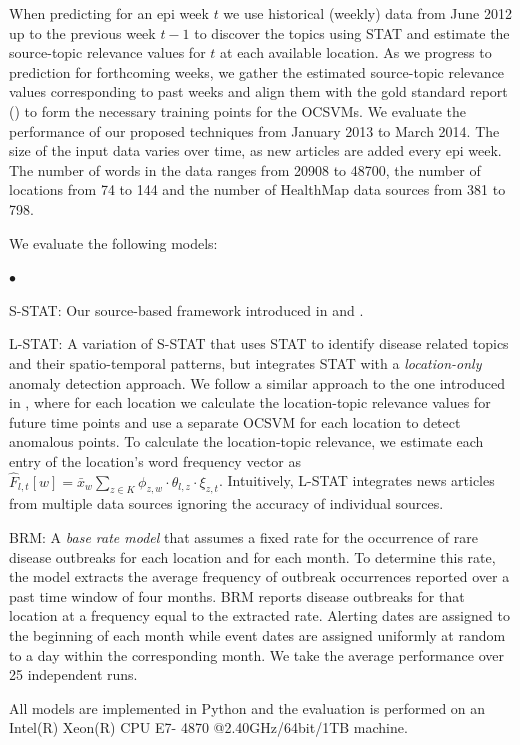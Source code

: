 \documentclass[conference]{IEEEtran}
\newcommand{\squishlist}{
   \begin{list}{$\bullet$}
    {
      \setlength{\itemsep}{0pt}
      \setlength{\parsep}{3pt}
      \setlength{\topsep}{3pt}
      \setlength{\partopsep}{0pt}
      \setlength{\leftmargin}{1.5em}
      \setlength{\labelwidth}{1em}
      \setlength{\labelsep}{0.5em} } }
\newcommand{\squishend}{
    \end{list}  }
\newcommand{\model}{{STAT}\xspace} %
\newcommand{\fullmodel}{{S-STAT}\xspace}
\newcommand{\locationmodel}{{L-STAT}\xspace}
\begin{document}
When predicting for an epi week $t$ we use historical (weekly) data from June 2012 up to the previous week $t-1$ to discover the topics using \model and estimate the source-topic relevance values for $t$ at each available location. As we progress to prediction for forthcoming weeks, we gather the estimated source-topic relevance values corresponding to past weeks and align them with the gold standard report () to  form the necessary training points for the OCSVMs. We evaluate the performance of our proposed techniques from January 2013 to March 2014. The size of the input data varies over time, as new articles are added every epi week. The number of words in the data ranges from 20908 to 48700, the number of locations from 74 to 144 and the number of HealthMap data sources from 381 to 798.

 We evaluate the following models:
\squishlist
\item \fullmodel: Our source-based framework introduced in  and . 
\item \locationmodel: A variation of \fullmodel that uses \model to identify disease related topics and their spatio-temporal patterns, but integrates \model with a {\em location-only} anomaly detection approach. We follow a similar approach to the one introduced in , where for each location we calculate the location-topic relevance values for future time points and use a separate OCSVM for each location to detect anomalous points. To calculate the location-topic relevance, we estimate each entry of the location's word frequency vector as $\hat{F}_{l,t}[w] = \bar{x}_{w} \sum_{z \in K}\phi_{z,w}\cdot \theta_{l,z} \cdot \xi_{z,t}$. Intuitively,  \locationmodel integrates news articles from multiple data sources ignoring the accuracy of individual sources.
\item BRM: A {\em base rate model} that assumes a fixed rate for the occurrence of rare disease outbreaks for each location and for each
month. To determine this rate, the model extracts the average frequency of outbreak occurrences reported over a past time window of four months. BRM reports disease outbreaks for that location at a frequency equal to the extracted rate. Alerting dates are assigned to the beginning of each month while event dates are assigned uniformly at random to a day within the corresponding month. We take the average performance over 25 independent runs.
\squishend
All models are implemented in Python and the evaluation is performed on an Intel(R) Xeon(R) CPU E7- 4870 @2.40GHz/64bit/1TB machine. 
\end{document}
